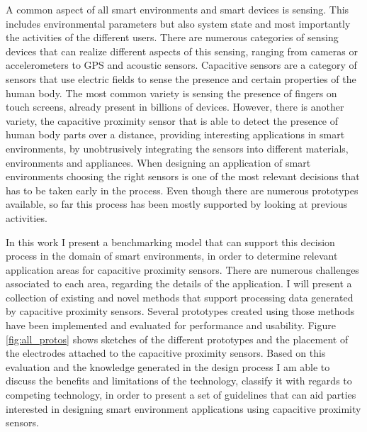 A common aspect of all smart environments and smart devices is sensing. This includes environmental parameters but also system state and most importantly the activities of the different users. There are numerous categories of sensing devices that can realize different aspects of this sensing, ranging from cameras or accelerometers to GPS and acoustic sensors. Capacitive sensors are a category of sensors that use electric fields to sense the presence and certain properties of the human body. The most common variety is sensing the presence of fingers on touch screens, already present in billions of devices. However, there is another variety, the capacitive proximity sensor that is able to detect the presence of human body parts over a distance, providing interesting applications in smart environments, by unobtrusively integrating the sensors into different materials, environments and appliances. When designing an application of smart environments choosing the right sensors is one of the most relevant decisions that has to be taken early in the process. Even though there are numerous prototypes available, so far this process has been mostly supported by looking at previous activities. 

In this work I present a benchmarking model that can support this decision process in the domain of smart environments, in order to determine relevant application areas for capacitive proximity sensors. There are numerous challenges associated to each area, regarding the details of the application. I will present a collection of existing and novel methods that support processing data generated by capacitive proximity sensors. Several prototypes created using those methods have been implemented and evaluated for performance and usability. Figure \ref{fig:all_protos} shows sketches of the different prototypes and the placement of the electrodes attached to the capacitive proximity sensors. Based on this evaluation and the knowledge generated in the design process I am able to discuss the benefits and limitations of the technology, classify it with regards to competing technology, in order to present a set of guidelines that can aid parties interested in designing smart environment applications using capacitive proximity sensors.
 
